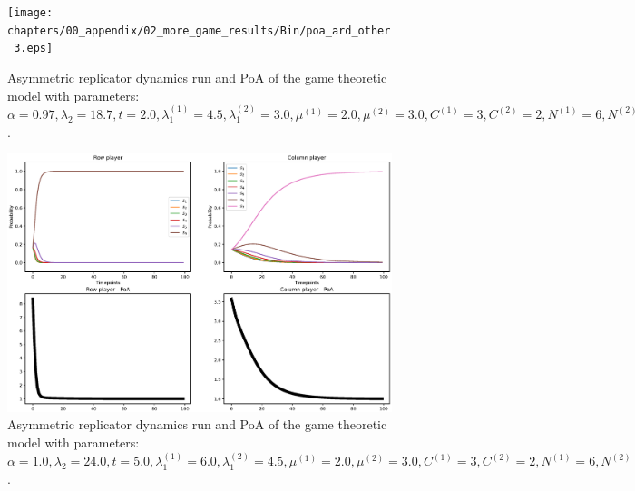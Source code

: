 \begin{figure}[H]
    \texttt{[image: chapters/00\_appendix/02\_more\_game\_results/Bin/poa\_ard\_other\_3.eps]}
    \caption{Asymmetric replicator dynamics run and PoA of the game theoretic
    model with parameters: \(\alpha = 0.97, \lambda_2 = 18.7, t = 2.0,
    \lambda_1^{(1)} = 4.5, \lambda_1^{(2)} = 3.0, \mu^{(1)} = 2.0,
    \mu^{(2)} = 3.0, C^{(1)} = 3, C^{(2)} = 2, N^{(1)} = 6, N^{(2)} = 7,
    M^{(1)} = 5, M^{(2)} = 4\).}
    \label{fig:poa_ard_other_3}
\end{figure}



\begin{figure}[H]
    \includegraphics[width=\textwidth, trim = 0 60 0 60, clip]{chapters/00_appendix/02_more_game_results/Bin/poa_ard_other_4.eps}
    \caption{Asymmetric replicator dynamics run and PoA of the game theoretic
    model with parameters: \(\alpha = 1.0, \lambda_2 = 24.0, t = 5.0,
    \lambda_1^{(1)} = 6.0, \lambda_1^{(2)} = 4.5, \mu^{(1)} = 2.0,
    \mu^{(2)} = 3.0, C^{(1)} = 3, C^{(2)} = 2, N^{(1)} = 6, N^{(2)} = 7,
    M^{(1)} = 5, M^{(2)} = 4\).}
    \label{fig:poa_ard_other_4}
\end{figure}
